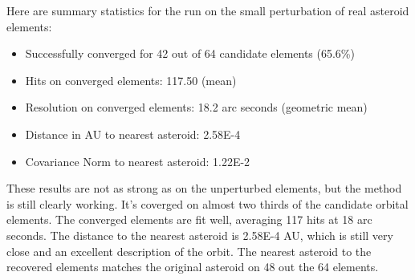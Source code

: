 Here are summary statistics for the run on the small perturbation of real asteroid elements:
\begin{itemize}
\item Successfully converged for 42 out of 64 candidate elements (65.6\%)
\item Hits on converged elements: 117.50 (mean)
\item Resolution on converged elements: 18.2 arc seconds (geometric mean)
\item Distance in AU to nearest asteroid: 2.58E-4
\item Covariance Norm to nearest asteroid: 1.22E-2
\end{itemize}
These results are not as strong as on the unperturbed elements, but the method is still clearly working.
It's coverged on almost two thirds of the candidate orbital elements.
The converged elements are fit well, averaging 117 hits at 18 arc seconds.
The distance to the nearest asteroid is 2.58E-4 AU, which is still very close and an excellent description of the orbit.
The nearest asteroid to the recovered elements matches the original asteroid on 48 out the 64 elements.

